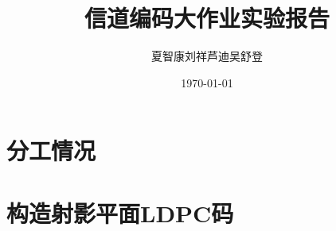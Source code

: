 \documentclass[lang=cn,11pt,a4paper,numbers]{elegantpaper}
\title{信道编码大作业实验报告}
\author{\kaishu\zihao{5} 夏智康\quad 刘祥\quad 芦迪\quad 吴舒登}
\institute{清华大学深圳国际研究生院 信息科学与技术学部，深计研19班}
\date{\today}
\begin{document}
\maketitle


\section{分工情况}



\section{构造射影平面LDPC码}
\end{document}
